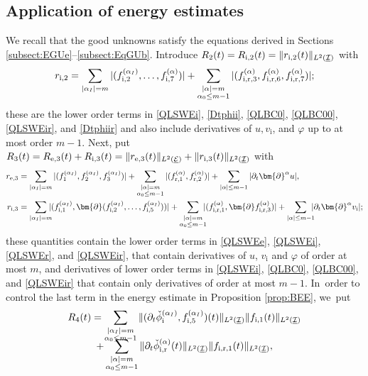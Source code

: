 \documentclass[10pt]{amsart}
\newcommand{\dt}{\partial_t}
\newcommand{\cI}{{\mathcal I}}
\newcommand{\cE}{{\mathcal E}}
\newcommand{\ul}[1]{\underline{#1}}
\theoremstyle{definition}
\begin{document}
\subsection{Application of energy estimates}\label{sectAppl}
We recall that the good unknowns satisfy the equations derived in Sections \ref{subsect:EGUe}--\ref{subsect:EqGUb}.
Introduce $R_2(t)=R_{{\rm i},2}(t)=\|r_{{\rm i},2}(t)\|_{L^2(\ul{\cI})}$ with
\[
r_{{\rm i},2} = \sum_{|\alpha_I|=m} |(f_{{\rm i},2}^{(\alpha_I)},\ldots,f_{{\rm i},7}^{(\alpha)})|
+ \sum_{\substack{|\alpha|=m\\\alpha_0\leq m-1}} |(f_{{\rm i,r},3}^{(\alpha)},f_{{\rm i,r},6}^{(\alpha)},f_{{\rm i,r},7}^{(\alpha)})|;
\]
these are the lower order terms in \eqref{QLSWEi}, \eqref{Dtphii}, \eqref{QLBC0}, \eqref{QLBC00}, \eqref{QLSWEir}, and \eqref{Dtphiir}
and also include derivatives of $u,v_\mathrm{i}$, and $\varphi$ up to at most order $m-1$.
Next, put $R_3(t)=R_{{\rm e},3}(t)+R_{{\rm i},3}(t)=\|r_{{\rm e},3}(t)\|_{L^2(\ul{\cE})}+\|r_{{\rm i},3}(t)\|_{L^2(\ul{\cI})}$ with
\begin{align*}
r_{{\rm e},3}
&= \sum_{|\alpha_I|=m} |(f_1^{(\alpha_I)},f_2^{(\alpha_I)},f_3^{(\alpha_I)})|
+ \sum_{\substack{|\alpha|=m\\\alpha_0\leq m-1}} |(f_{{\rm r},1}^{(\alpha)},f_{{\rm r},2}^{(\alpha)})| + \sum_{|\alpha|\leq m-1}|\dt\bm{\partial}^\alpha u|, \\
r_{{\rm i},3}
&= \sum_{|\alpha_I|=m}\hspace*{-2mm} |(f_{{\rm i},1}^{(\alpha_I)},\bm{\partial}(f_{{\rm i},2}^{(\alpha_I)},\ldots,f_{{\rm i},5}^{(\alpha_I)}))|
+ \sum_{\substack{|\alpha|=m\\\alpha_0\leq m-1}}\hspace*{-2mm} |(f_{{\rm i,r},1}^{(\alpha)},\bm{\partial}f_{{\rm i,r},3}^{(\alpha)})|
+ \sum_{|\alpha|\leq m-1}\hspace*{-2mm}|\dt\bm{\partial}^\alpha v_\mathrm{i}|;
\end{align*}
these quantities contain the lower order terms in \eqref{QLSWEe}, \eqref{QLSWEi}, \eqref{QLSWEr}, and \eqref{QLSWEir},
that contain derivatives of $u$, $v_\mathrm{i}$ and $\varphi$ of order at most $m$, and derivatives of lower order terms in
\eqref{QLSWEi}, \eqref{QLBC0}, \eqref{QLBC00}, and \eqref{QLSWEir} that contain only derivatives of order at most $m-1$. In~order to control the last term in the energy estimate in Proposition \ref{prop:BEE}, we~put
\begin{multline*}
R_4(t)
= \sum_{\substack{|\alpha_I|=m\\ \alpha_0\leq m-1}} \|(\dt\check{\phi}_\mathrm{i}^{(\alpha_I)},f_{{\rm i},5}^{(\alpha_I)})(t)\|_{L^2(\ul{\cI})}
\|f_{{\rm i},1}(t)\|_{L^2(\ul{\cI})} \\[-8pt]
+ \sum_{\substack{|\alpha|=m\\ \alpha_0\leq m-1}} \|\dt\check{\phi}_\mathrm{i,r}^{(\alpha)}(t)\|_{L^2(\ul{\cI})} \|f_{{\rm i,r},1}(t)\|_{L^2(\ul{\cI})},
\end{multline*}
\end{document}
